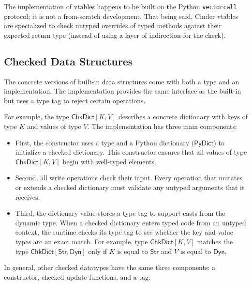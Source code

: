 \documentclass[english,cleveref,submission]{programming}
\newcommand{\code}[1]{\texttt{#1}}
\newcommand{\typefont}[1]{\mathsf{#1}}
\newcommand{\paramtype}[2]{#1[#2]}
\newcommand{\sptstr}{\typefont{Str}}
\newcommand{\sptdyn}{\typefont{Dyn}}
\newcommand{\sptrawpydict}{\typefont{PyDict}}
\newcommand{\sptchkdict}[2]{\paramtype{\typefont{ChkDict}}{#1, #2}}
\begin{document}
The implementation of vtables happens to be built on the Python \code{vectorcall}
protocol; it is not a from-scratch development.
That being said, Cinder vtables are specialized to check untyped overrides
of typed methods against their expected return type (instead of using a layer of
indirection for the check).




\subsection{Checked Data Structures}
\label{s:chkdict-impl}

The concrete versions of built-in data structures come with both a type and an
implementation.
The implementation provides the same interface as the built-in but uses a
type tag to reject certain operations.

For example, the type $\sptchkdict{K}{V}$ describes a concrete dictionary
with keys of type $K$ and values of type $V$.
The implementation has three main components:
\begin{itemize}
  \item
    First, the constructor uses a type and a Python dictionary ($\sptrawpydict$)
    to initialize a checked dictionary.
    This constructor ensures that all values of type $\sptchkdict{K}{V}$
    begin with well-typed elements.
  \item
    Second, all write operations check their input.
    Every operation that mutates or extends a checked dictionary must
    validate any untyped arguments that it receives.
  \item
    Third, the dictionary value stores a type tag to support casts from the dynamic type.
    When a checked dictionary enters typed code from an untyped context,
    the runtime checks its type tag to see whether the key and value types are an exact match.
    For example, type $\sptchkdict{K}{V}$ matches the type
    $\sptchkdict{\sptstr}{\sptdyn}$ only if $K$ is equal to $\sptstr$
    and $V$ is equal to $\sptdyn$,
\end{itemize}
%
In general, other checked datatypes have the same three components:
a constructor, checked update functions, and a tag.
\end{document}
